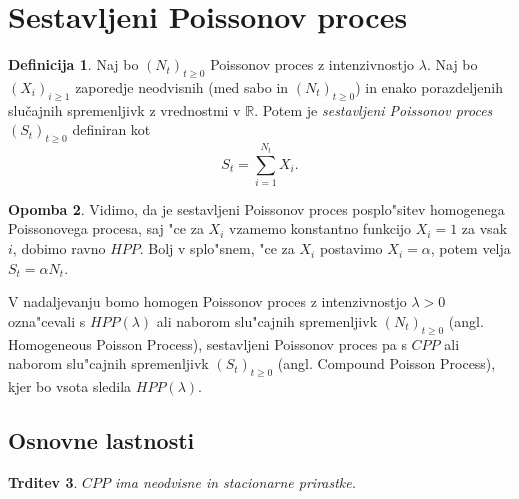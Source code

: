 \documentclass[12pt, a4paper, reqno]{amsart}
\theoremstyle{definition}
\newtheorem{definicija}{Definicija}[section]
\newtheorem{opomba}[definicija]{Opomba}
\theoremstyle{plain}
\newtheorem{trditev}[definicija]{Trditev}
\newcommand{\1}{\mathds{1}}
\begin{document}
\section{Sestavljeni Poissonov proces}

    \begin{center}
    \end{center}
    \begin{definicija}
        Naj bo $(N_t)_{t\geq0}$ Poissonov proces z intenzivnostjo $\lambda$. 
        Naj bo $(X_i)_{i\geq1}$ zaporedje neodvisnih (med sabo in $(N_t)_{t\geq0}$) in enako 
        porazdeljenih slučajnih spremenljivk z vrednostmi v $\mathbb{R}$. Potem je 
        \textit{sestavljeni Poissonov proces} $(S_t)_{t\geq0}$ definiran kot
        $$
            S_t = \sum_{i=1}^{N_t} X_i.
        $$
        \label{def:CPP}
    \end{definicija}

    \begin{opomba}
        Vidimo, da je sestavljeni Poissonov proces posplo"sitev homogenega Poissonovega procesa, saj "ce za
        $X_i$ vzamemo konstantno funkcijo $X_i = 1$ za vsak $i$, dobimo ravno $HPP$. Bolj v splo"snem, "ce za $X_i$ 
        postavimo $X_i = \alpha$, potem velja $S_t = \alpha N_t$.
        \label{op:CPPHPPPovezava}
    \end{opomba}

    V nadaljevanju bomo homogen Poissonov proces z intenzivnostjo $\lambda >0$ ozna"cevali s $HPP(\lambda)$ 
    ali naborom slu"cajnih spremenljivk $(N_t)_{t\geq0}$ (angl. Homogeneous Poisson Process), 
    sestavljeni Poissonov proces pa s $CPP$ ali naborom slu"cajnih spremenljivk $(S_t)_{t\geq0}$ 
    (angl. Compound Poisson Process), kjer bo vsota sledila $HPP(\lambda)$.

    \subsection{Osnovne lastnosti}

        \begin{trditev}
            $CPP$ ima neodvisne in stacionarne prirastke.
            \label{trd:neodvPrirCPP}
        \end{trditev}
\end{document}
